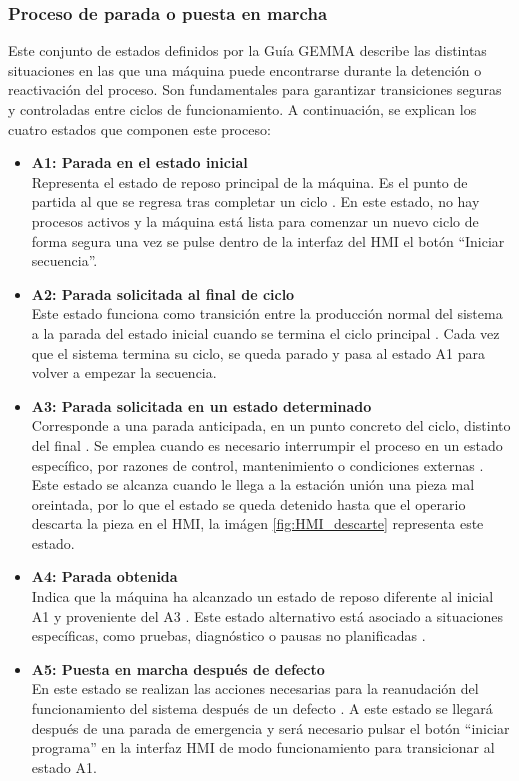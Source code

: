 \subsubsection{Proceso de parada o puesta en marcha}

Este conjunto de estados definidos por la Guía GEMMA describe las distintas situaciones en las que una máquina puede encontrarse durante la detención o reactivación del proceso. Son fundamentales para garantizar transiciones seguras y controladas entre ciclos de funcionamiento. A continuación, se explican los cuatro estados que componen este proceso:

\begin{itemize}
    \item \textbf{A1: Parada en el estado inicial} \\
    Representa el estado de reposo principal de la máquina. Es el punto de partida al que se regresa tras completar un ciclo \cite{quia_gemma}. En este estado, no hay procesos activos y la máquina está lista para comenzar un nuevo ciclo de forma segura una vez se pulse dentro de la interfaz del HMI el botón ``Iniciar secuencia''.

    \item \textbf{A2: Parada solicitada al final de ciclo} \\
    Este estado funciona como transición entre la producción normal del sistema a la parada del estado inicial cuando se termina el ciclo principal \cite{guia_gemma}. Cada vez que el sistema termina su ciclo, se queda parado y pasa al estado A1 para volver a empezar la secuencia.
    
    \item \textbf{A3: Parada solicitada en un estado determinado} \\
    Corresponde a una parada anticipada, en un punto concreto del ciclo, distinto del final \cite{guia_gemma}. Se emplea cuando es necesario interrumpir el proceso en un estado específico, por razones de control, mantenimiento o condiciones externas \cite{quia_gemma}. Este estado se alcanza cuando le llega a la estación unión una pieza mal oreintada, por lo que el estado se queda detenido hasta que el operario descarta la pieza en el HMI, la imágen \ref{fig:HMI_descarte} representa este estado.

    \item \textbf{A4: Parada obtenida} \\
    Indica que la máquina ha alcanzado un estado de reposo diferente al inicial A1 y proveniente del A3 \cite{guia_gemma}. Este estado alternativo está asociado a situaciones específicas, como pruebas, diagnóstico o pausas no planificadas \cite{guia_gemma}. 
    
   \item \textbf{A5: Puesta en marcha después de defecto} \\
   En este estado se realizan las acciones necesarias para la reanudación del funcionamiento del sistema después de un defecto \cite{guia_gemma}. A este estado se llegará después de una parada de emergencia y será necesario pulsar el botón ``iniciar programa'' en la interfaz HMI de modo funcionamiento para transicionar al estado A1.
\end{itemize}

